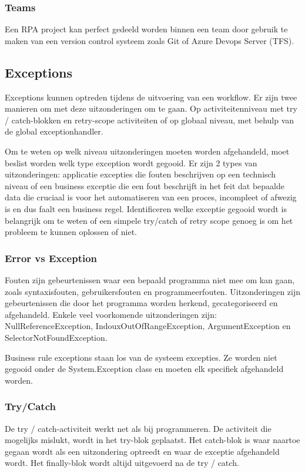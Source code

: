 \subsubsection{Teams}
Een RPA project kan perfect gedeeld worden binnen een team door gebruik te maken van een version control systeem zoals Git of Azure Devops Server (TFS).

\subsection{Exceptions}
Exceptions  kunnen optreden tijdens de uitvoering van een workflow. Er zijn twee manieren om met deze uitzonderingen om te gaan. Op activiteitenniveau met try / catch-blokken en retry-scope activiteiten of op globaal niveau, met behulp van de global exceptionhandler.

Om te weten op welk niveau uitzonderingen moeten worden afgehandeld, moet beslist worden welk type exception wordt gegooid. Er zijn 2 types van uitzonderingen: applicatie excepties die fouten beschrijven op een technisch niveau of een business exceptie die een fout beschrijft in het feit dat bepaalde data die cruciaal is voor het automatiseren van een proces, incompleet of afwezig is en dus faalt een business regel. Identificeren welke exceptie gegooid wordt is belangrijk om te weten of een simpele try/catch of retry scope genoeg is om het probleem te kunnen oplossen of niet.

\subsubsection{Error vs Exception}
Fouten zijn gebeurtenissen waar een bepaald programma niet mee om kan gaan, zoals syntaxisfouten, gebruikersfouten en programmeerfouten.
Uitzonderingen zijn gebeurtenissen die door het programma worden herkend, gecategoriseerd en afgehandeld. Enkele veel voorkomende uitzonderingen zijn: NullReferenceException, IndouxOutOfRangeException, ArgumentException en SelectorNotFoundException.

Business rule exceptions staan los van de systeem excepties. Ze worden niet gegooid onder de System.Exception class en moeten elk specifiek afgehandeld worden.

\subsubsection{Try/Catch}
De try / catch-activiteit werkt net als bij programmeren. De activiteit die mogelijks mislukt, wordt in het try-blok geplaatst. Het catch-blok is waar naartoe gegaan wordt als een uitzondering optreedt en waar de exceptie afgehandeld wordt. Het finally-blok wordt altijd uitgevoerd na de try / catch.

